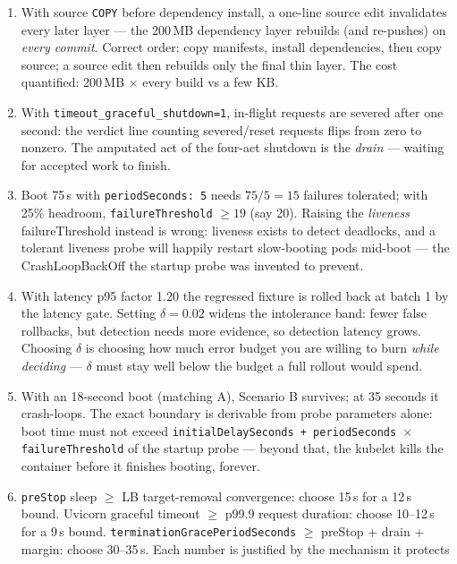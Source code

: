 \begin{enumerate}[label=\textbf{Exercise 7.\arabic*}, leftmargin=3.4em]
  \item With source \texttt{COPY} before dependency install, a one-line
    source edit invalidates every later layer --- the 200\,MB dependency
    layer rebuilds (and re-pushes) on \emph{every commit}. Correct order:
    copy manifests, install dependencies, then copy source; a source edit
    then rebuilds only the final thin layer. The cost quantified: 200\,MB
    $\times$ every build vs a few KB.
  \item With \texttt{timeout\_graceful\_shutdown=1}, in-flight requests are
    severed after one second: the verdict line counting severed/reset
    requests flips from zero to nonzero. The amputated act of the four-act
    shutdown is the \emph{drain} --- waiting for accepted work to finish.
  \item Boot 75\,s with \texttt{periodSeconds: 5} needs $75/5 = 15$
    failures tolerated; with 25\% headroom, \texttt{failureThreshold} $\ge
    19$ (say 20). Raising the \emph{liveness} failureThreshold instead is
    wrong: liveness exists to detect deadlocks, and a tolerant liveness
    probe will happily restart slow-booting pods mid-boot --- the
    CrashLoopBackOff the startup probe was invented to prevent.
  \item With latency p95 factor 1.20 the regressed fixture is rolled back at
    batch 1 by the latency gate. Setting $\delta = 0.02$ widens the
    intolerance band: fewer false rollbacks, but detection needs more
    evidence, so detection latency grows. Choosing $\delta$ is choosing how
    much error budget you are willing to burn \emph{while deciding} ---
    $\delta$ must stay well below the budget a full rollout would spend.
  \item With an 18-second boot (matching A), Scenario B survives; at 35
    seconds it crash-loops. The exact boundary is derivable from probe
    parameters alone: boot time must not exceed \texttt{initialDelaySeconds
    + periodSeconds $\times$ failureThreshold} of the startup probe ---
    beyond that, the kubelet kills the container before it finishes
    booting, forever.
  \item \texttt{preStop} sleep $\ge$ LB target-removal convergence: choose
    15\,s for a 12\,s bound. Uvicorn graceful timeout $\ge$ p99.9 request
    duration: choose 10--12\,s for a 9\,s bound.
    \texttt{terminationGracePeriodSeconds} $\ge$ preStop + drain + margin:
    choose 30--35\,s. Each number is justified by the mechanism it protects

\end{enumerate}
